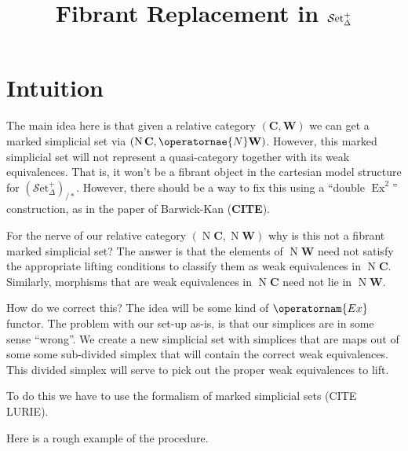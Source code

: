 \documentclass[english]{amsart}
\title{Fibrant Replacement in $\sset^+$}
\author{}
\date{}
\newcommand{\mc}{\mathcal}
\newcommand{\mbf}{\mathbf}
\newcommand{\sset}{\mc{S}\text{et}_\Delta}
\theoremstyle{definition}
\begin{document}
\maketitle
\tableofcontents


\section{Intuition}


The main idea here is that given a relative category $(\mbf{C},\mbf{W})$ we can get a marked simplicial set via $(\operatorname{N}\mbf{C},\operatornae{N}\mbf{W})$. However, this marked simplicial set will not represent a quasi-category together with its weak equivalences. That is, it won't be a fibrant object in the cartesian model structure for $(\sset^+)_{/\ast}$.  However, there should be a way to fix this using a ``double $\operatorname{Ex}^2$'' construction, as in the paper of Barwick-Kan (\textbf{CITE}). 

For the nerve of our relative category $(\operatorname{N}\mbf{C},\operatorname{N}\mbf{W})$ why is this not a fibrant marked simplicial set? The answer is that the elements of $\operatorname{N}\mbf{W}$ need not satisfy the appropriate lifting conditions to classify them as weak equivalences in $\operatorname{N}\mbf{C}$. Similarly, morphisms that are weak equivalences in $\operatorname{N}\mbf{C}$ need not lie in $\operatorname{N}\mbf{W}$. 

How do we correct this? The idea will be some kind of $\operatornam{Ex}$ functor. The problem with our set-up as-is, is that our simplices are in some sense ``wrong''. We create a new simplicial set with simplices that are maps out of some some sub-divided simplex that will contain the correct weak equivalences. This divided simplex will serve to pick out the proper weak equivalences to lift. 

To do this we have to use the formalism of marked simplicial sets (CITE LURIE).

Here is a rough example of the procedure. 
\end{document}
